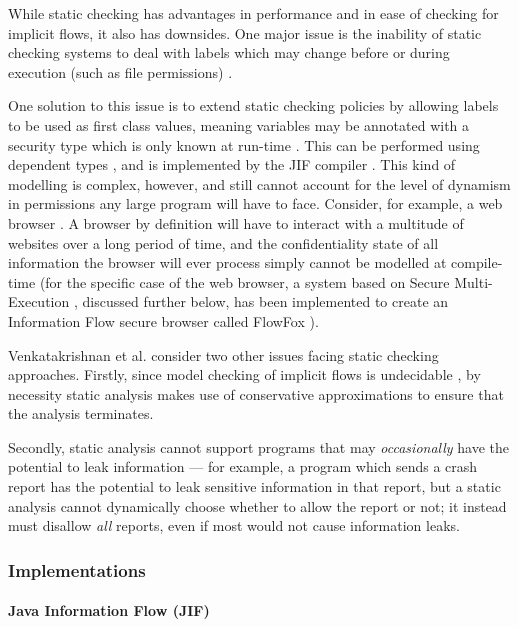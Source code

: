While static checking has advantages in performance and in ease of checking for implicit flows, it also has downsides. One major issue is the inability of static checking systems to deal with labels which may change before or during execution (such as file permissions) \cite{sabelfeld2003if}.

One solution to this issue is to extend static checking policies by allowing labels to be used as first class values, meaning variables may be annotated with a security type which is only known at run-time \cite{myers1997if}. This can be performed using dependent types \cite{xi1999dependenttypes}, and is implemented by the JIF compiler \cite{myers1999jif}. This kind of modelling is complex, however, and still cannot account for the level of dynamism in permissions any large program will have to face. Consider, for example, a web browser \cite{venkatakrishnan2006runtime}. A browser by definition will have to interact with a multitude of websites over a long period of time, and the confidentiality state of all information the browser will ever process simply cannot be modelled at compile-time (for the specific case of the web browser, a system based on Secure Multi-Execution \cite{devriese2010sme}, discussed further below, has been implemented to create an Information Flow secure browser called FlowFox \cite{degroef2012flowfox}).

Venkatakrishnan et al. \cite{venkatakrishnan2006runtime} consider two other issues facing static checking approaches. Firstly, since model checking of implicit flows is undecidable \cite{landi1992undecidability}, by necessity static analysis makes use of conservative approximations to ensure that the analysis terminates.

Secondly, static analysis cannot support programs that may \textit{occasionally} have the potential to leak information \cite{venkatakrishnan2006runtime} --- for example, a program which sends a crash report has the potential to leak sensitive information in that report, but a static analysis cannot dynamically choose whether to allow the report or not; it instead must disallow \textit{all} reports, even if most would not cause information leaks.

\subsubsection{Implementations}

\paragraph{Java Information Flow (JIF)}

